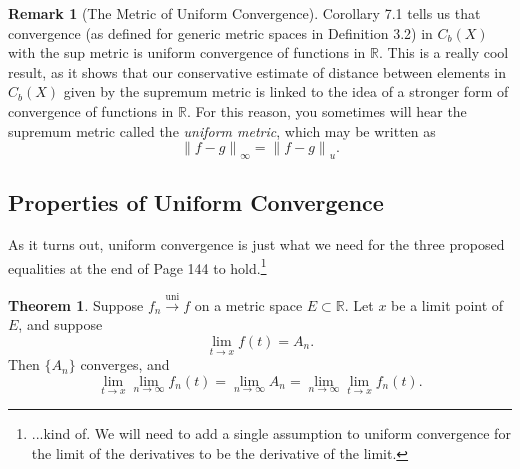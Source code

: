 \documentclass{article}
\newcommand{\R}{\mathbb{R}}
\newcommand{\norm}[1]{\left\lVert#1\right\rVert}
\newcommand{\uni}{\overset{\text{uni}}{\to}}
\theoremstyle{definition}
\newtheorem{theorem}{Theorem}[section]
\newtheorem{remark}{Remark}[section]
\begin{document}
	\begin{remark}[The Metric of Uniform Convergence]
		Corollary 7.1 tells us that  convergence  (as defined for generic metric spaces in Definition 3.2) in $ C_b(X) $ with the sup metric is uniform convergence of functions in $ \R $. This is a really cool result, as it shows that our conservative estimate of distance between elements in $ C_b(X) $ given by the supremum metric is linked to the idea of a stronger form of convergence of functions in $ \R $. For this reason, you sometimes will hear the supremum metric called the \textit{\color{red}uniform metric}, which may be written as $$ \norm{f-g}_\infty=\norm{f-g}_u.$$ 
	\end{remark}
	
	\subsection{Properties of Uniform Convergence}
	As it turns out, uniform convergence is just what we need for the three proposed equalities at the end of Page 144 to hold.\footnote{...kind of. We will need to add a single assumption to uniform convergence for the limit of the derivatives to be the derivative of the limit.}
	\begin{theorem}
		Suppose $ f_n\uni f $ on a metric space $ E\subset \R $. Let $ x $ be a limit point of $ E $, and suppose $$\lim\limits_{t\to x}f(t)=A_n .$$ Then $ \{A_n\} $ converges, and $$ \lim\limits_{t\to x}\lim\limits_{n\to\infty}f_n(t)=\lim\limits_{n\to\infty} A_n=\lim\limits_{n\to\infty} \lim\limits_{t\to x}f_n(t). $$
	\end{theorem}
\end{document}
